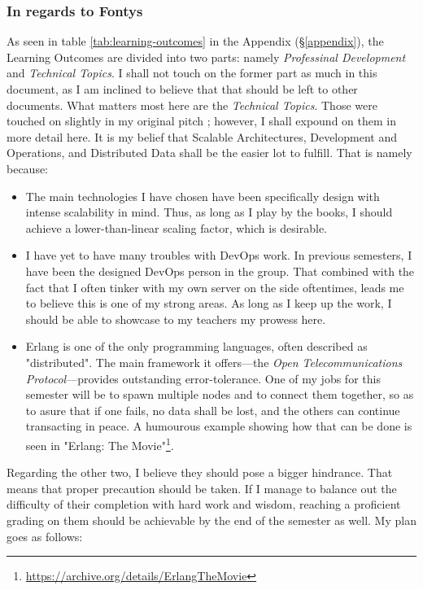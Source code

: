 \documentclass{article}
\begin{document}
    \subsubsection{In regards to Fontys}
        As seen in table \ref{tab:learning-outcomes} in the Appendix (\S\ref{appendix}), the Learning Outcomes are divided into two parts: namely \emph{Professinal Development} and \emph{Technical Topics}. I shall not touch on the former part as much in this document, as I am inclined to believe that that should be left to other documents. What matters most here are the \emph{Technical Topics}. Those were touched on slightly in my original pitch \cite{s6-ind-pitch}; however, I shall expound on them in more detail here. It is my belief that Scalable Architectures, Development and Operations, and Distributed Data shall be the easier lot to fulfill. That is namely because:
        \begin{itemize}
            \item The main technologies I have chosen have been specifically design with intense scalability in mind. Thus, as long as I play by the books, I should achieve a lower-than-linear scaling factor, which is desirable.
            \item I have yet to have many troubles with DevOps work. In previous semesters, I have been the designed DevOps person in the group. That combined with the fact that I often tinker with my own server on the side oftentimes, leads me to believe this is one of my strong areas. As long as I keep up the work, I should be able to showcase to my teachers my prowess here.
            \item Erlang is one of the only programming languages, often described as "distributed". The main framework it offers---the \emph{Open Telecommunications Protocol}---provides outstanding error-tolerance. One of my jobs for this semester will be to spawn multiple nodes and to connect them together, so as to asure that if one fails, no data shall be lost, and the others can continue transacting in peace. A humourous example showing how that can be done is seen in "Erlang: The Movie"\footnote{\url{https://archive.org/details/ErlangTheMovie}}.
        \end{itemize}
        \newpage
        Regarding the other two, I believe they should pose a bigger hindrance. That means that proper precaution should be taken. If I manage to balance out the difficulty of their completion with hard work and wisdom, reaching a proficient grading on them should be achievable by the end of the semester as well. My plan goes as follows:
\end{document}
